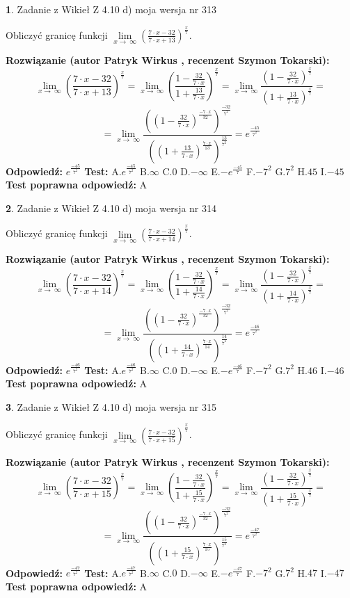 \documentclass[12pt, a4paper]{article}
\theoremstyle{definition} %
\newtheorem{zad}{}
\newcommand{\zadStart}[1]{\begin{zad}#1\newline}
\newcommand{\zadStop}{\end{zad}}
\newcommand{\rozwStart}[2]{\noindent \textbf{Rozwiązanie (autor #1 , recenzent #2): }\newline}
\newcommand{\rozwStop}{\newline}
\newcommand{\odpStart}{\noindent \textbf{Odpowiedź:}\newline}
\newcommand{\odpStop}{\newline}
\newcommand{\testStart}{\noindent \textbf{Test:}\newline}
\newcommand{\testStop}{\newline}
\newcommand{\kluczStart}{\noindent \textbf{Test poprawna odpowiedź:}\newline}
\newcommand{\kluczStop}{\newline}
\begin{document}
\zadStart{Zadanie z Wikieł Z 4.10 d) moja wersja nr 313}


Obliczyć granicę funkcji  $\lim\limits_{x\to\ \infty}(\frac{7\cdot x-32}{7\cdot x+13})^{\frac{x}{7}}$.
\zadStop
\rozwStart{Patryk Wirkus}{Szymon Tokarski}
$$\lim\limits_{x\to\ \infty}(\frac{7\cdot x-32}{7\cdot x+13})^{\frac{x}{7}} = \lim\limits_{x\to\ \infty}(\frac{1-\frac{32}{7\cdot x}}{1+\frac{13}{7\cdot x}})^{\frac{x}{7}}=\lim\limits_{x\to\ \infty}\frac{(1-\frac{32}{7\cdot x})^{\frac{x}{7}}}{(1+\frac{13}{7\cdot x})^{\frac{x}{7}}}=$$
$$=\lim\limits_{x\to\ \infty}\frac{((1-\frac{32}{7\cdot x})^{\frac{-7\cdot x}{32}})^{\frac{-32}{7^{2}}}}{((1+\frac{13}{7\cdot x})^{\frac{7\cdot x}{13}})^{\frac{13}{7^{2}}}}=e^{\frac{-45}{7^{2}}}$$
\rozwStop
\odpStart
$e^{\frac{-45}{7^{2}}}$
\odpStop
\testStart
A.$e^{\frac{-45}{7^{2}}}$ B.$\infty$ C.$0$ D.$-\infty$ E.$-e^{\frac{-45}{7}}$
F.$-7^{2}$ G.$7^{2}$
H.$45$
I.$-45$
\testStop
\kluczStart
A
\kluczStop



\zadStart{Zadanie z Wikieł Z 4.10 d) moja wersja nr 314}


Obliczyć granicę funkcji  $\lim\limits_{x\to\ \infty}(\frac{7\cdot x-32}{7\cdot x+14})^{\frac{x}{7}}$.
\zadStop
\rozwStart{Patryk Wirkus}{Szymon Tokarski}
$$\lim\limits_{x\to\ \infty}(\frac{7\cdot x-32}{7\cdot x+14})^{\frac{x}{7}} = \lim\limits_{x\to\ \infty}(\frac{1-\frac{32}{7\cdot x}}{1+\frac{14}{7\cdot x}})^{\frac{x}{7}}=\lim\limits_{x\to\ \infty}\frac{(1-\frac{32}{7\cdot x})^{\frac{x}{7}}}{(1+\frac{14}{7\cdot x})^{\frac{x}{7}}}=$$
$$=\lim\limits_{x\to\ \infty}\frac{((1-\frac{32}{7\cdot x})^{\frac{-7\cdot x}{32}})^{\frac{-32}{7^{2}}}}{((1+\frac{14}{7\cdot x})^{\frac{7\cdot x}{14}})^{\frac{14}{7^{2}}}}=e^{\frac{-46}{7^{2}}}$$
\rozwStop
\odpStart
$e^{\frac{-46}{7^{2}}}$
\odpStop
\testStart
A.$e^{\frac{-46}{7^{2}}}$ B.$\infty$ C.$0$ D.$-\infty$ E.$-e^{\frac{-46}{7}}$
F.$-7^{2}$ G.$7^{2}$
H.$46$
I.$-46$
\testStop
\kluczStart
A
\kluczStop



\zadStart{Zadanie z Wikieł Z 4.10 d) moja wersja nr 315}


Obliczyć granicę funkcji  $\lim\limits_{x\to\ \infty}(\frac{7\cdot x-32}{7\cdot x+15})^{\frac{x}{7}}$.
\zadStop
\rozwStart{Patryk Wirkus}{Szymon Tokarski}
$$\lim\limits_{x\to\ \infty}(\frac{7\cdot x-32}{7\cdot x+15})^{\frac{x}{7}} = \lim\limits_{x\to\ \infty}(\frac{1-\frac{32}{7\cdot x}}{1+\frac{15}{7\cdot x}})^{\frac{x}{7}}=\lim\limits_{x\to\ \infty}\frac{(1-\frac{32}{7\cdot x})^{\frac{x}{7}}}{(1+\frac{15}{7\cdot x})^{\frac{x}{7}}}=$$
$$=\lim\limits_{x\to\ \infty}\frac{((1-\frac{32}{7\cdot x})^{\frac{-7\cdot x}{32}})^{\frac{-32}{7^{2}}}}{((1+\frac{15}{7\cdot x})^{\frac{7\cdot x}{15}})^{\frac{15}{7^{2}}}}=e^{\frac{-47}{7^{2}}}$$
\rozwStop
\odpStart
$e^{\frac{-47}{7^{2}}}$
\odpStop
\testStart
A.$e^{\frac{-47}{7^{2}}}$ B.$\infty$ C.$0$ D.$-\infty$ E.$-e^{\frac{-47}{7}}$
F.$-7^{2}$ G.$7^{2}$
H.$47$
I.$-47$
\testStop
\kluczStart
A
\kluczStop
\end{document}
